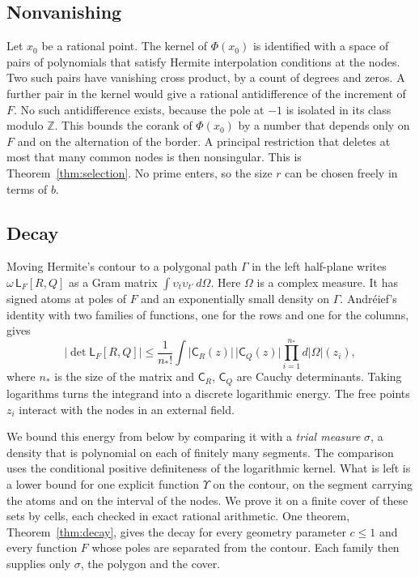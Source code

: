 \documentclass[11pt]{amsart}
\theoremstyle{definition}
\theoremstyle{remark}
\numberwithin{equation}{section}
\newcommand{\Z}{\mathbb Z}
\newcommand{\Lw}{\mathsf L}          %
\begin{document}
\subsection{Nonvanishing}
Let $x_0$ be a rational point. The kernel of $\Phi(x_0)$ is identified with a space of pairs of polynomials that satisfy
Hermite interpolation conditions at the nodes. Two such pairs have vanishing cross product, by a count of degrees and
zeros. A further pair in the kernel would give a rational antidifference of the increment of $F$. No such
antidifference exists, because the pole at $-1$ is isolated in its class modulo $\Z$. This bounds the corank of
$\Phi(x_0)$ by a number that depends only on $F$ and on the alternation of the border. A principal restriction that
deletes at most that many common nodes is then nonsingular. This is Theorem~\ref{thm:selection}. No prime enters, so
the size $r$ can be chosen freely in terms of $b$.

\subsection{Decay}
Moving Hermite's contour to a polygonal path $\Gamma$ in the left half-plane writes $\omega\,\Lw_F[R,Q]$ as a Gram matrix
$\int\upsilon_t\upsilon_{t'}\,d\Omega$. Here $\Omega$ is a complex measure. It has signed atoms at poles of $F$ and an
exponentially small density on $\Gamma$. Andr\'eief's identity with two families of functions, one for the rows and one
for the columns, gives
\[
 |\det\Lw_F[R,Q]|\le\frac1{n_*!}\int\bigl|\mathsf C_R(z)\bigr|\,\bigl|\mathsf C_Q(z)\bigr|\prod_{i=1}^{n_*}d|\Omega|(z_i),
\]
where $n_*$ is the size of the matrix and $\mathsf C_R$, $\mathsf C_Q$ are Cauchy determinants. Taking logarithms turns
the integrand into a discrete logarithmic energy. The free points $z_i$ interact with the nodes in an external field.

We bound this energy from below by comparing it with a \emph{trial measure} $\sigma$, a density that is polynomial on
each of finitely many segments. The comparison uses the conditional positive definiteness of the logarithmic kernel.
What is left is a lower bound for one explicit function $\Upsilon$ on the contour, on the segment carrying the atoms and
on the interval of the nodes. We prove it on a finite cover of these sets by cells, each checked in exact rational
arithmetic. One theorem, Theorem~\ref{thm:decay}, gives the decay for every geometry parameter $c\le1$ and every
function $F$ whose poles are separated from the contour. Each family then supplies only $\sigma$, the polygon and the
cover.
\end{document}
